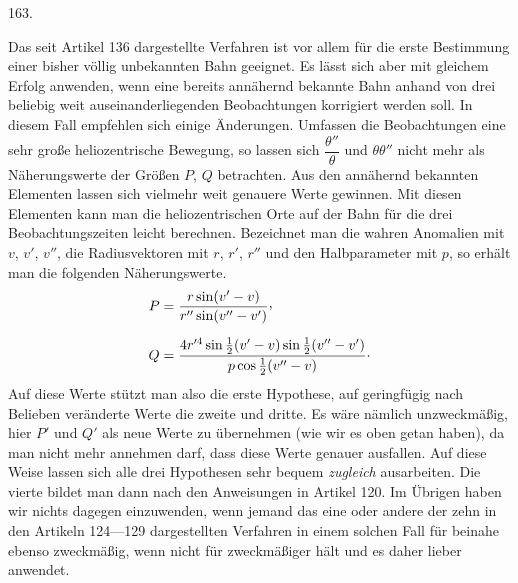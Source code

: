 \par{}\medskip
\begin{center}\hypertarget{native-226-article163}{}163.\end{center}
Das seit Artikel 136 dargestellte Verfahren ist vor allem für die erste Bestimmung einer bisher völlig unbekannten Bahn geeignet. Es lässt sich aber mit gleichem Erfolg anwenden, wenn eine bereits annähernd bekannte Bahn anhand von drei beliebig weit auseinanderliegenden Beobachtungen korrigiert werden soll. In diesem Fall empfehlen sich einige Änderungen. Umfassen die Beobachtungen eine sehr große heliozentrische Bewegung, so lassen sich $\dfrac{\theta''}{\theta}$ und $\theta\theta''$ nicht mehr als Näherungswerte der Größen $P$, $Q$ betrachten. Aus den annähernd bekannten Elementen lassen sich vielmehr weit genauere Werte gewinnen. Mit diesen Elementen kann man die heliozentrischen Orte auf der Bahn für die drei Beobachtungszeiten leicht berechnen. Bezeichnet man die wahren Anomalien mit $v$, $v'$, $v''$, die Radiusvektoren mit $r$, $r'$, $r''$ und den Halbparameter mit $p$, so erhält man die folgenden Näherungswerte.
\[
\begin{aligned}
P&=\frac{r\sin(v'-v)}{r''\sin(v''-v')}\mathpunct{\raisebox{.45ex}{,}}\\[.6em]
Q&=\frac{4r'^4\sin\frac12(v'-v)\sin\frac12(v''-v')}{p\cos\frac12(v''-v)}\mathpunct{\cdot}
\end{aligned}
\]
\noindent Auf diese Werte stützt man also die erste Hypothese, auf geringfügig nach Belieben veränderte Werte die zweite und dritte. Es wäre nämlich unzweckmäßig, hier $P'$ und $Q'$ als neue Werte zu übernehmen (wie wir es oben getan haben), da man nicht mehr annehmen darf, dass diese Werte genauer ausfallen. Auf diese Weise lassen sich alle drei Hypothesen sehr bequem \emph{zugleich} ausarbeiten. Die vierte bildet man dann nach den Anweisungen in Artikel 120. Im Übrigen haben wir nichts dagegen einzuwenden, wenn jemand das eine oder andere der zehn in den Artikeln 124---129 dargestellten Verfahren in einem solchen Fall für beinahe ebenso zweckmäßig, wenn nicht für zweckmäßiger hält und es daher lieber anwendet.
\par\nopagebreak[4]\smallskip{\centering\rule{.23\linewidth}{.35pt}\par}
